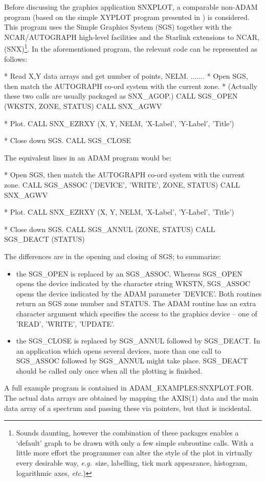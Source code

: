 \documentclass[twoside,11pt,nolof]{starlink}
\begin{document}
Before discussing the graphics application SNXPLOT,
a comparable non-ADAM program
(based on the simple XYPLOT program presented in
) is considered.
This program uses the Simple Graphics System (SGS) together with the
NCAR/AUTOGRAPH high-level facilities and the Starlink extensions to NCAR,
(SNX)\footnote{Sounds daunting, however the combination of these packages
enables a `default' graph to be drawn with only a few simple subroutine calls.
With a little more effort the programmer can alter  the style of the plot
in virtually every desirable way,
\textit{e.g.}\ size, labelling, tick mark appearance, histogram, logarithmic
axes,  \textit{etc.})}.
In the aforementioned program, the relevant code can be
represented as follows:
\begin{terminalv}
*  Read  X,Y data arrays and get number of points, NELM.
      .......
*  Open SGS, then match the AUTOGRAPH co-ord system with the current zone.
*  (Actually these two calls are usually packaged as SNX_AGOP.)
      CALL SGS_OPEN (WKSTN, ZONE, STATUS)
      CALL SNX_AGWV

*   Plot.
      CALL SNX_EZRXY (X, Y, NELM, 'X-Label', 'Y-Label', 'Title')

*   Close down SGS.
      CALL SGS_CLOSE
\end{terminalv}
The equivalent lines in an ADAM program would be:
\begin{terminalv}
*  Open SGS, then match the AUTOGRAPH co-ord system with the current zone.
      CALL SGS_ASSOC ('DEVICE', 'WRITE', ZONE, STATUS)
      CALL SNX_AGWV

*   Plot.
      CALL SNX_EZRXY (X, Y, NELM, 'X-Label', 'Y-Label', 'Title')

*   Close down SGS.
      CALL SGS_ANNUL (ZONE, STATUS)
      CALL SGS_DEACT (STATUS)
\end{terminalv}
The differences are in the opening and closing of SGS; to summarize:
\begin{itemize}
\item the SGS\_OPEN is replaced by an SGS\_ASSOC.
Whereas SGS\_OPEN opens the device indicated by the character string WKSTN,
SGS\_ASSOC opens the device indicated by the ADAM parameter 'DEVICE'.
Both routines return an SGS zone number and STATUS. The ADAM routine has an
extra character argument which specifies the access to the graphics device
-- one of 'READ', 'WRITE', 'UPDATE'.
\item the SGS\_CLOSE is replaced by SGS\_ANNUL followed by SGS\_DEACT.
In an application which opens several devices, more than
one call to SGS\_ASSOC followed by SGS\_ANNUL might take place.
SGS\_DEACT should be called only once when all the
plotting is finished.
\end{itemize}
A full example program is contained in ADAM\_EXAMPLES:SNXPLOT.FOR.
The actual data arrays are obtained by mapping the AXIS(1) data and the
main data array of a spectrum and passing these via  pointers,
but that is incidental.
\end{document}
